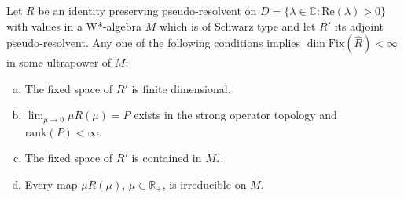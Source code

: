 \begin{theorem}\label{thm:d4-4-4}
Let \(R\) be an identity preserving pseudo-resolvent on \(D = \{\lambda \in \mathbb{C}: \text{Re}(\lambda) > 0\}\) with values in a W*-algebra \(M\) which is of Schwarz type and let \(R'\) its adjoint pseudo-resolvent.
Any one of the following conditions implies \(\dim \text{Fix}(\hat{R}) < \infty\) in some ultrapower of \(M\):

\begin{enumerate}[(a)]
\item
The fixed space of \(R'\) is finite dimensional.

\item
\(\lim_{\mu \to 0} \mu R(\mu) = P\) exists in the strong operator topology and \(\text{rank}(P) < \infty\).

\item
The fixed space of \(R'\) is contained in \(M_{*}\).

\item
Every map \(\mu R(\mu)\), \(\mu \in \mathbb{R}_{+}\), is irreducible on \(M\).
\end{enumerate}
\end{theorem}

